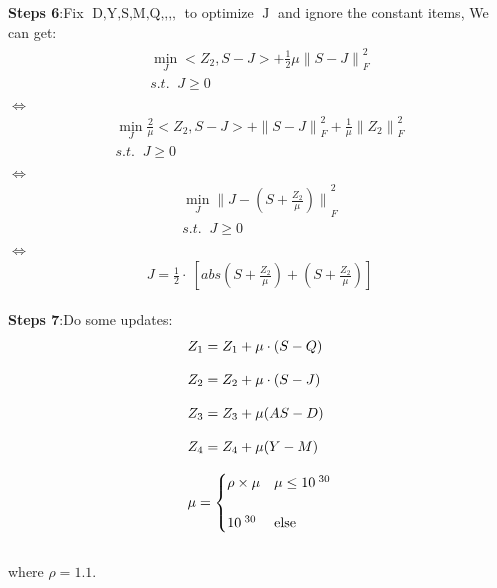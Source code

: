 \documentclass{article}
\begin{document}
\begin{flushleft}
\textbf{Steps 6}:\;\;Fix $\mathop{D,Y,S,M,Q,Z_1,Z_2,Z_3,Z_4}$ to optimize $\mathop{J}$ and ignore the constant items, We can get:
\begin{eqnarray}
\begin{array}{l}
    \mathop{\min}\limits_{J} <Z_2,S-J> + \frac{1}{2}\mu {\parallel S - J \parallel}_F^2  \\
    s.t. \;\; J \geq 0\\
\end{array}
\end{eqnarray}
$\Longleftrightarrow$
\begin{eqnarray}
\begin{array}{l}
    \mathop{\min}\limits_{J} \frac{2}{\mu} <Z_2,S-J> + {\parallel S - J \parallel}_F^2  + \frac{1}{\mu}{\parallel Z_2\parallel}_F^2\\
    s.t. \;\; J \geq 0\\
\end{array}
\end{eqnarray}
$\Longleftrightarrow$
\begin{eqnarray}
\begin{array}{l}
    \mathop{\min}\limits_{J} {\parallel J-(S+ \frac{Z_2}{\mu} )\parallel}_F^2\\
    s.t. \;\; J \geq 0\\
\end{array}
\end{eqnarray}
$\Longleftrightarrow$
\begin{eqnarray}
\begin{array}{l}
    J=\frac{1}{2}\cdot\ [abs(S+ \frac{Z_2}{\mu})+ (S+ \frac{Z_2}{\mu})]
\end{array}
\end{eqnarray}
\end{flushleft}

\begin{flushleft}
\textbf{Steps 7}:\;\;Do some updates:
\begin{eqnarray}
\begin{array}{l}
Z_1 = Z_1 + \mu \cdot (S-Q)\\\\
Z_2 = Z_2 + \mu \cdot (S-J)\\\\
Z_3 = Z_3 + \mu (AS - D)\\\\
Z_4 = Z_4 + \mu (Y - M)\\\\
$$ \mu=
\begin{cases}
\rho \times \mu & \mu \leq 10^{\;30}\\\\
10^{\;30}         & \text {else}
\end{cases}$$
\end{array}
\end{eqnarray}\\
where $\rho = 1.1 $.
\end{flushleft}
\end{document}

